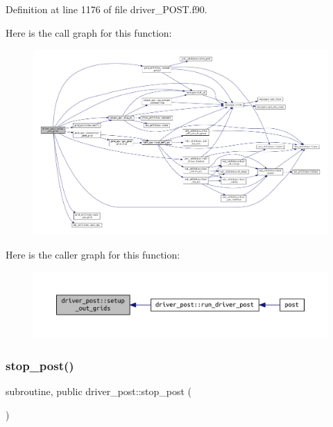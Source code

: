 Definition at line 1176 of file driver\+\_\+\+P\+O\+S\+T.\+f90.

Here is the call graph for this function\+:\nopagebreak
\begin{figure}[H]
\begin{center}
\leavevmode
\includegraphics[width=350pt]{namespacedriver__post_a3438685c5fb7302f756c368fb5f940ee_cgraph}
\end{center}
\end{figure}
Here is the caller graph for this function\+:\nopagebreak
\begin{figure}[H]
\begin{center}
\leavevmode
\includegraphics[width=350pt]{namespacedriver__post_a3438685c5fb7302f756c368fb5f940ee_icgraph}
\end{center}
\end{figure}
\mbox{\label{namespacedriver__post_a71f9fb1935222111e1c7cfc15c5d0269}} 
\subsubsection{\texorpdfstring{stop\+\_\+post()}{stop\_post()}}
{\footnotesize\ttfamily subroutine, public driver\+\_\+post\+::stop\+\_\+post (\begin{DoxyParamCaption}{ }\end{DoxyParamCaption})}



